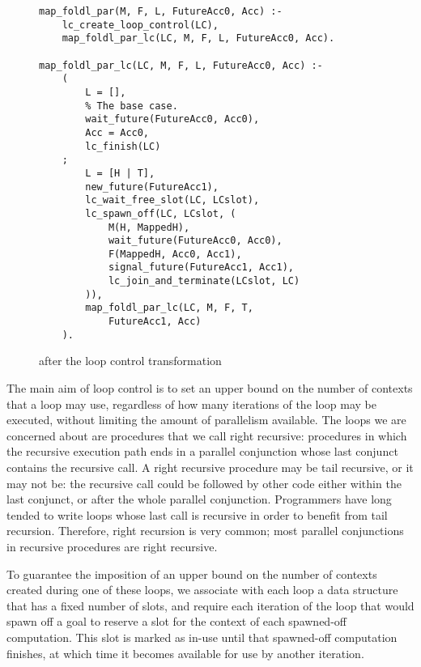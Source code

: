 
\begin{figure}[tb]
\begin{verbatim}
map_foldl_par(M, F, L, FutureAcc0, Acc) :-
    lc_create_loop_control(LC),
    map_foldl_par_lc(LC, M, F, L, FutureAcc0, Acc).

map_foldl_par_lc(LC, M, F, L, FutureAcc0, Acc) :-
    (
        L = [],
        % The base case.
        wait_future(FutureAcc0, Acc0),
        Acc = Acc0,
        lc_finish(LC)
    ;
        L = [H | T],
        new_future(FutureAcc1),
        lc_wait_free_slot(LC, LCslot),
        lc_spawn_off(LC, LCslot, (
            M(H, MappedH),
            wait_future(FutureAcc0, Acc0),
            F(MappedH, Acc0, Acc1),
            signal_future(FutureAcc1, Acc1),
            lc_join_and_terminate(LCslot, LC)
        )),
        map_foldl_par_lc(LC, M, F, T,
            FutureAcc1, Acc)
    ).
\end{verbatim}
\caption{\mapfoldlpar after the loop control transformation}
\label{fig:map_foldl_transformed}
\end{figure}

The main aim of loop control is to set an upper bound
on the number of contexts that a loop may use,
regardless of how many iterations of the loop may be executed,
without limiting the amount of parallelism available.
The loops we are concerned about
are procedures that we call right recursive:
procedures in which the recursive execution path
ends in a parallel conjunction
whose last conjunct contains the recursive call.
A right recursive procedure may be tail recursive, or it may not be:
the recursive call could be followed by other code
either within the last conjunct, or after the whole parallel conjunction.
Programmers have long tended to write loops whose last call is recursive
in order to benefit from tail recursion.
Therefore,
right recursion is very common;
most parallel conjunctions in recursive procedures are right recursive.

To guarantee the imposition of an upper bound
on the number of contexts created during one of these loops,
we associate with each loop a data structure
that has a fixed number of slots,
and require each iteration of the loop that would spawn off a goal
to reserve a slot for the context of each spawned-off computation.
This slot is marked as in-use until that spawned-off computation finishes,
at which time it becomes available for use by another iteration.

